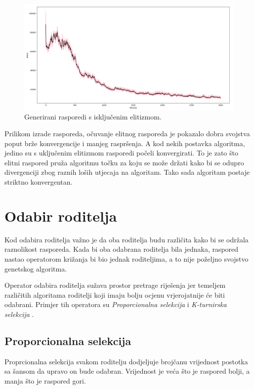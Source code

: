 \documentclass[times, utf8, zavrsni]{fer}
\begin{document}
\begin{figure}[htb]
\centering
\includegraphics[width=14cm]{images/elitizam_ne.png}
\caption{Generirani rasporedi s isključenim elitizmom.}
\label{fig:elitiziam_ne}
\end{figure}

Prilikom izrade rasporeda, očuvanje elitnog rasporeda je pokazalo dobra svojstva poput brže konvergencije i manjeg raspršenja. A kod nekih postavka algoritma, jedino su s uključenim elitizmom rasporedi počeli konvergirati. To je zato što elitni raspored pruža algoritmu točku za koju se može držati kako bi se odupro divergenciji zbog raznih loših utjecaja na algoritam. Tako sada algoritam postaje striktno konvergentan.

\section{Odabir roditelja}

Kod odabira roditelja važno je da oba roditelja budu različita kako bi se održala raznolikost rasporeda. Kada bi oba odabrana roditelja bila jednaka, raspored nastao operatorom križanja bi bio jednak roditeljima, a to nije poželjno svojstvo genetskog algoritma.

Operator odabira roditelja sužava prostor pretrage riješenja jer temeljem različitih algoritama roditelji koji imaju bolju ocjenu vrjerojatnije će biti odabrani. Primjer tih operatora su \emph{Proporcionalna selekcija}  i \emph{K-turnirska selekcija} .

\subsection{Proporcionalna selekcija}

Proprcionalna selekcija svakom roditelju dodjeljuje brojčanu vrijednost postotka sa šansom da upravo on bude odabran. Vrijednost je veća što je raspored bolji, a manja što je raspored gori.
\end{document}
